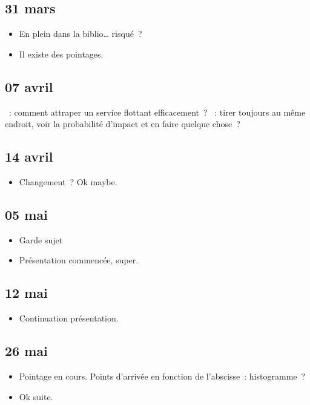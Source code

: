 \documentclass[a4paper, 11pt, final, garamond]{book}
\begin{document}
\subsection{31 mars}
\begin{itemize}
  \item En plein dans la biblio… risqué~?
  \item Il existe des pointages.
\end{itemize}

\subsection{07 avril}
\begin{itemize}
  ~: comment attraper un service flottant efficacement~?
  ~: tirer toujours au même endroit, voir la probabilité d'impact et
    en faire quelque chose~?
\end{itemize}

\subsection{14 avril}
\begin{itemize}
  \item Changement~? Ok maybe.
\end{itemize}

\subsection{05 mai}
\begin{itemize}
  \item Garde sujet
  \item Présentation commencée, super.
\end{itemize}

\subsection{12 mai}
\begin{itemize}
  \item Continuation présentation.
\end{itemize}

\subsection{26 mai}
\begin{itemize}
  \item Pointage en cours. Points d'arrivée en fonction de l'abscisse~:
    histogramme~?
  \item Ok suite.
\end{itemize}
\end{document}
